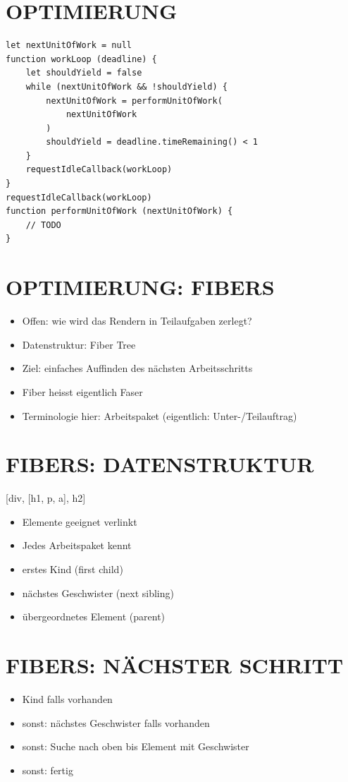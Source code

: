 \section*{OPTIMIERUNG}
\begin{verbatim}
let nextUnitOfWork = null
function workLoop (deadline) {
    let shouldYield = false
    while (nextUnitOfWork && !shouldYield) {
        nextUnitOfWork = performUnitOfWork(
            nextUnitOfWork
        )
        shouldYield = deadline.timeRemaining() < 1
    }
    requestIdleCallback(workLoop)
}
requestIdleCallback(workLoop)
function performUnitOfWork (nextUnitOfWork) {
    // TODO
}
\end{verbatim}

\section*{OPTIMIERUNG: FIBERS}
\begin{itemize}
  \item Offen: wie wird das Rendern in Teilaufgaben zerlegt?
  \item Datenstruktur: Fiber Tree
  \item Ziel: einfaches Auffinden des nächsten Arbeitsschritts
  \item Fiber heisst eigentlich Faser
  \item Terminologie hier: Arbeitspaket (eigentlich: Unter-/Teilauftrag)
\end{itemize}

\section*{FIBERS: DATENSTRUKTUR}
[div, [h1, p, a], h2]

\begin{itemize}
  \item Elemente geeignet verlinkt
  \item Jedes Arbeitspaket kennt
  \item erstes Kind (first child)
  \item nächstes Geschwister (next sibling)
  \item übergeordnetes Element (parent)
\end{itemize}

\section*{FIBERS: NÄCHSTER SCHRITT}
\begin{itemize}
  \item Kind falls vorhanden
  \item sonst: nächstes Geschwister falls vorhanden
  \item sonst: Suche nach oben bis Element mit Geschwister
  \item sonst: fertig
\end{itemize}

